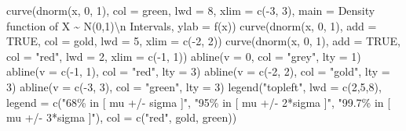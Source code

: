 \documentclass[
  letterpaper,
  DIV=11,
  numbers=noendperiod]{scrreprt}
\newenvironment{Shaded}{\begin{snugshade}}{\end{snugshade}}
\newcommand{\AttributeTok}[1]{\textcolor[rgb]{0.40,0.45,0.13}{#1}}
\newcommand{\ConstantTok}[1]{\textcolor[rgb]{0.56,0.35,0.01}{#1}}
\newcommand{\DecValTok}[1]{\textcolor[rgb]{0.68,0.00,0.00}{#1}}
\newcommand{\FunctionTok}[1]{\textcolor[rgb]{0.28,0.35,0.67}{#1}}
\newcommand{\NormalTok}[1]{\textcolor[rgb]{0.00,0.23,0.31}{#1}}
\newcommand{\SpecialCharTok}[1]{\textcolor[rgb]{0.37,0.37,0.37}{#1}}
\newcommand{\StringTok}[1]{\textcolor[rgb]{0.13,0.47,0.30}{#1}}
\begin{document}
\begin{Shaded}
\begin{Highlighting}[]
\FunctionTok{curve}\NormalTok{(}\FunctionTok{dnorm}\NormalTok{(x, }\DecValTok{0}\NormalTok{, }\DecValTok{1}\NormalTok{), }\AttributeTok{col =} \StringTok{\textquotesingle{}green\textquotesingle{}}\NormalTok{, }\AttributeTok{lwd =} \DecValTok{8}\NormalTok{, }\AttributeTok{xlim =} \FunctionTok{c}\NormalTok{(}\SpecialCharTok{{-}}\DecValTok{3}\NormalTok{, }\DecValTok{3}\NormalTok{), }\AttributeTok{main =} \StringTok{\textquotesingle{}Density function of X \textasciitilde{} N(0,1)}\SpecialCharTok{\textbackslash{}n}\StringTok{ Intervals\textquotesingle{}}\NormalTok{, }\AttributeTok{ylab =} \StringTok{\textquotesingle{}f(x)\textquotesingle{}}\NormalTok{)}
\FunctionTok{curve}\NormalTok{(}\FunctionTok{dnorm}\NormalTok{(x, }\DecValTok{0}\NormalTok{, }\DecValTok{1}\NormalTok{), }\AttributeTok{add =} \ConstantTok{TRUE}\NormalTok{, }\AttributeTok{col =} \StringTok{\textquotesingle{}gold\textquotesingle{}}\NormalTok{, }\AttributeTok{lwd =} \DecValTok{5}\NormalTok{, }\AttributeTok{xlim =} \FunctionTok{c}\NormalTok{(}\SpecialCharTok{{-}}\DecValTok{2}\NormalTok{, }\DecValTok{2}\NormalTok{))}
\FunctionTok{curve}\NormalTok{(}\FunctionTok{dnorm}\NormalTok{(x, }\DecValTok{0}\NormalTok{, }\DecValTok{1}\NormalTok{), }\AttributeTok{add =} \ConstantTok{TRUE}\NormalTok{, }\AttributeTok{col =} \StringTok{"red"}\NormalTok{, }\AttributeTok{lwd =} \DecValTok{2}\NormalTok{, }\AttributeTok{xlim =} \FunctionTok{c}\NormalTok{(}\SpecialCharTok{{-}}\DecValTok{1}\NormalTok{, }\DecValTok{1}\NormalTok{))}
\FunctionTok{abline}\NormalTok{(}\AttributeTok{v =} \DecValTok{0}\NormalTok{, }\AttributeTok{col =} \StringTok{"grey"}\NormalTok{, }\AttributeTok{lty =} \DecValTok{1}\NormalTok{)}
\FunctionTok{abline}\NormalTok{(}\AttributeTok{v =} \FunctionTok{c}\NormalTok{(}\SpecialCharTok{{-}}\DecValTok{1}\NormalTok{, }\DecValTok{1}\NormalTok{), }\AttributeTok{col =} \StringTok{"red"}\NormalTok{, }\AttributeTok{lty =} \DecValTok{3}\NormalTok{)}
\FunctionTok{abline}\NormalTok{(}\AttributeTok{v =} \FunctionTok{c}\NormalTok{(}\SpecialCharTok{{-}}\DecValTok{2}\NormalTok{, }\DecValTok{2}\NormalTok{), }\AttributeTok{col =} \StringTok{"gold"}\NormalTok{, }\AttributeTok{lty =} \DecValTok{3}\NormalTok{)}
\FunctionTok{abline}\NormalTok{(}\AttributeTok{v =} \FunctionTok{c}\NormalTok{(}\SpecialCharTok{{-}}\DecValTok{3}\NormalTok{, }\DecValTok{3}\NormalTok{), }\AttributeTok{col =} \StringTok{"green"}\NormalTok{, }\AttributeTok{lty =} \DecValTok{3}\NormalTok{)}
\FunctionTok{legend}\NormalTok{(}\StringTok{"topleft"}\NormalTok{, }\AttributeTok{lwd =} \FunctionTok{c}\NormalTok{(}\DecValTok{2}\NormalTok{,}\DecValTok{5}\NormalTok{,}\DecValTok{8}\NormalTok{),}
       \AttributeTok{legend =} \FunctionTok{c}\NormalTok{(}\StringTok{"68\% in [ mu +/{-} sigma ]"}\NormalTok{, }
                  \StringTok{"95\% in [ mu +/{-} 2*sigma ]"}\NormalTok{, }
                  \StringTok{"99.7\% in [ mu +/{-} 3*sigma ]"}\NormalTok{),}
       \AttributeTok{col =} \FunctionTok{c}\NormalTok{(}\StringTok{"red"}\NormalTok{, }\StringTok{\textquotesingle{}gold\textquotesingle{}}\NormalTok{, }\StringTok{\textquotesingle{}green\textquotesingle{}}\NormalTok{))}
\end{Highlighting}
\end{Shaded}
\end{document}
